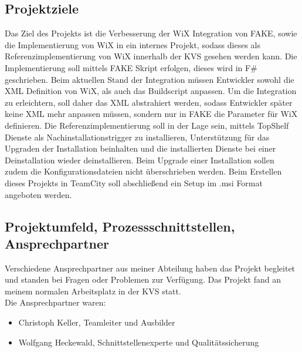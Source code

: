 \documentclass[10pt,a4paper, twoside]{article}
\begin{document}
\subsection{Projektziele}
Das Ziel des Projekts ist die Verbesserung der WiX Integration von FAKE, sowie die Implementierung von WiX in ein internes Projekt, sodass dieses als Referenzimplementierung von WiX innerhalb der KVS gesehen werden kann.
Die Implementierung soll mittels FAKE Skript erfolgen, dieses wird in F\# geschrieben.
Beim aktuellen Stand der Integration müssen Entwickler sowohl die XML Definition von WiX, als auch das Buildscript anpassen.
Um die Integration zu erleichtern, soll daher das XML abstrahiert werden, sodass Entwickler später keine XML mehr anpassen müssen, sondern nur in FAKE die Parameter für WiX definieren.
Die Referenzimplementierung soll in der Lage sein, mittels TopShelf Dienste als Nachinstallationstrigger zu installieren, Unterstützung für das Upgraden der Installation beinhalten und die installierten Dienste bei einer Deinstallation wieder deinstallieren.
Beim Upgrade einer Installation sollen zudem die Konfigurationsdateien nicht überschrieben werden.
Beim Erstellen dieses Projekts in TeamCity soll abschließend ein Setup im .msi Format angeboten werden.
\subsection{Projektumfeld, Prozessschnittstellen, Ansprechpartner}
Verschiedene Ansprechpartner aus meiner Abteilung haben das Projekt begleitet und standen bei Fragen oder Problemen zur Verfügung.
Das Projekt fand an meinem normalen Arbeitsplatz in der KVS statt.\\[1ex]
Die Ansprechpartner waren:
\begin{itemize}
\item Christoph Keller, Teamleiter und Ausbilder
\item Wolfgang Heckewald, Schnittstellenexperte und Qualitätssicherung
\end{itemize}
\end{document}
